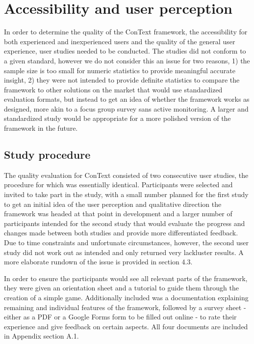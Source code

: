 
\chapter{Accessibility and user perception}\label{chapter:userstudy}
In order to determine the quality of the ConText framework, the accessibility for both experienced and inexperienced users and the quality of the general user experience, user studies needed to be conducted. The studies did not conform to a given standard, however we do not consider this an issue for two reasons, 1) the sample size is too small for numeric statistics to provide meaningful accurate insight, 2) they were not intended to provide definite statistics to compare the framework to other solutions on the market that would use standardized evaluation formats, but instead to get an idea of whether the framework works as designed, more akin to a focus group survey sans active monitoring. A larger and standardized study would be appropriate for a more polished version of the framework in the future. 

\section{Study procedure}
The quality evaluation for ConText consisted of two consecutive user studies, the procedure for which was essentially identical. Participants were selected and invited to take part in the study, with a small number planned for the first study to get an initial idea of the user perception and qualitative direction the framework was headed at that point in development and a larger number of participants intended for the second study that would evaluate the progress and changes made between both studies and provide more differentiated  feedback. Due to time constraints and unfortunate circumstances, however, the second user study did not work out as intended and only returned very lackluster results. A more elaborate rundown of the issue is provided in section 4.3.

In order to ensure the participants would see all relevant parts of the framework, they were given an orientation sheet and a tutorial to guide them through the creation of a simple game. Additionally included was a documentation explaining remaining and individual features of the framework, followed by a survey sheet - either as a PDF or a Google Forms form to be filled out online - to rate their experience and give feedback on certain aspects.
All four documents are included in Appendix section A.1.
